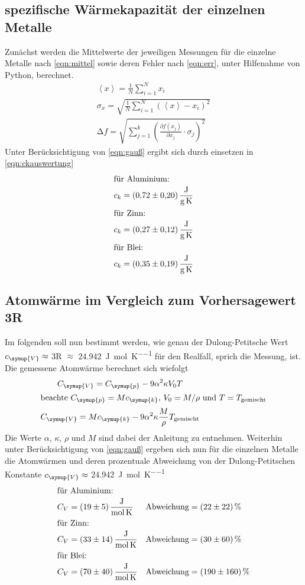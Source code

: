 \subsection{spezifische Wärmekapazität der einzelnen Metalle}
Zunächst werden die Mittelwerte der jeweiligen Messungen für die
einzelne Metalle nach \eqref{eqn:mittel} sowie deren Fehler nach \eqref{eqn:err}, unter Hilfenahme von
Python, berechnet.
\begin{gather}
  \left<x\right> = \frac{1}{N}\sum_{i=1}^N x_i
  \label{eqn:mittel}\\
  \sigma_x = \sqrt{\frac{1}{N}\sum_{i=1}^N \left(\left<x\right>-x_i\right)^2}
  \label{eqn:err}\\
  \increment f = \sqrt{\sum_{j=1}^k\left(\frac{\partial f\left(x_j\right)}{\partial x_j}\cdot\sigma_j\right)^{\!\!2}}
  \label{eqn:gauß}
\end{gather}
Unter Berücksichtigung von \eqref{eqn:gauß} ergibt sich durch einsetzen
in \eqref{eqn:ckauswertung}
\begin{gather*}
  \intertext{für Aluminium:}
  c_k =\SI{0,72(20)}{\joule\per\gram\per\kelvin}\\
  \intertext{für Zinn:}
  c_k =\SI{0,27(12)}{\joule\per\gram\per\kelvin}\\
  \intertext{für Blei:}
  c_k =\SI{0,35(19)}{\joule\per\gram\per\kelvin}
\end{gather*}

\subsection{Atomwärme im Vergleich zum Vorhersagewert 3R}
Im folgenden soll nun bestimmt werden, wie genau der Dulong-Petitsche
Wert $c_\symup{V}\approx$ 3R $\approx$ \SI{24,942}{\joule\per\mol\per\kelvin}
für den Realfall, sprich die Messung, ist. Die gemessene Atomwärme
berechnet sich wiefolgt
\begin{gather}
  C_\symup{V}=C_\symup{p}-9\alpha^2\kappa V_0T\\
  \intertext{beachte $C_\symup{p}=Mc_\symup{k}$, $V_0 = M/\rho$ und $T=T_\text{gemischt}$}
  C_\symup{V}=Mc_\symup{k}-9\alpha^2\kappa\frac{M}{\rho}T_\text{gemischt}
  \label{eqn:CV}
\end{gather}
Die Werte $\alpha$, $\kappa$, $\rho$ und $M$ sind dabei der
Anleitung zu entnehmen. Weiterhin unter Berücksichtigung von \eqref{eqn:gauß}
ergeben sich nun für die einzelnen Metalle die Atomwärmen und deren
prozentuale Abweichung von der Dulong-Petitschen Konstante
$c_\symup{V}\approx$ \SI{24,942}{\joule\per\mol\per\kelvin}
\begin{align*}
  \intertext{für Aluminium:}
  C_V&=\SI{19(5)}{\joule\per\mol\per\kelvin}&
  \text{Abweichung}&=\SI{22(22)}{\percent}\\
  \intertext{für Zinn:}
  C_V&=\SI{33(14)}{\joule\per\mol\per\kelvin}&
  \text{Abweichung}&=\SI{30(60)}{\percent}\\
  \intertext{für Blei:}
  C_V&=\SI{70(40)}{\joule\per\mol\per\kelvin}&
  \text{Abweichung}&=\SI{190(160)}{\percent}
\end{align*}
